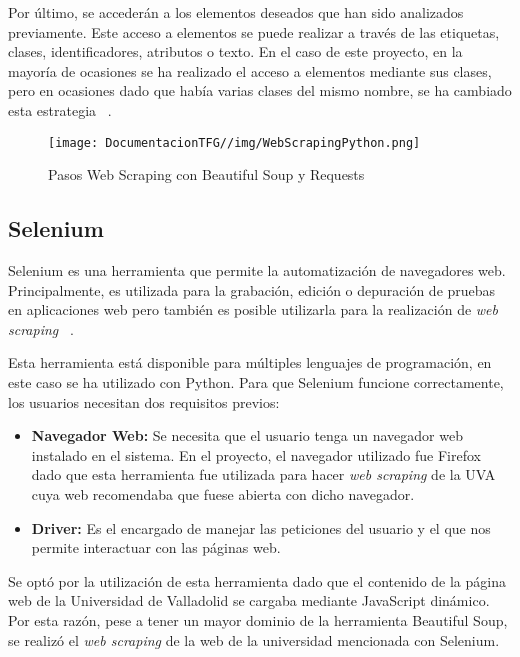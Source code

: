 Por último, se accederán a los elementos deseados que han sido analizados previamente. Este acceso a elementos se puede realizar a través de las etiquetas, clases, identificadores, atributos o texto. En el caso de este proyecto, en la mayoría de ocasiones se ha realizado el acceso a elementos mediante sus clases, pero en ocasiones dado que había varias clases del mismo nombre, se ha cambiado esta estrategia ~\cite{beautifulsoup:latex}.

\begin{figure}[H]
    \centering
    \texttt{[image: DocumentacionTFG//img/WebScrapingPython.png]}
    \caption{Pasos Web Scraping con Beautiful Soup y Requests}
    \label{fig:enter-label}
\end{figure}

\subsection{Selenium}
Selenium es una herramienta que permite la automatización de navegadores web. Principalmente, es utilizada para la grabación, edición o depuración de pruebas en aplicaciones web pero también es posible utilizarla para la realización de \textit{web scraping} ~\cite{selenium:latex}.

Esta herramienta está disponible para múltiples lenguajes de programación, en este caso se ha utilizado con Python. Para que Selenium funcione correctamente, los usuarios necesitan dos requisitos previos:

\begin{itemize}
    \item \textbf{Navegador Web:} Se necesita que el usuario tenga un navegador web instalado en el sistema. En el proyecto, el navegador utilizado fue Firefox dado que esta herramienta fue utilizada para hacer \textit{web scraping} de la UVA cuya web recomendaba que fuese abierta con dicho navegador.
    \item \textbf{Driver:} Es el encargado de manejar las peticiones del usuario y el que nos permite interactuar con las páginas web.
\end{itemize}

Se optó por la utilización de esta herramienta dado que el contenido de la página web de la Universidad de Valladolid se cargaba mediante JavaScript dinámico. Por esta razón, pese a tener un mayor dominio de la herramienta Beautiful Soup, se realizó el \textit{web scraping} de la web de la universidad mencionada con Selenium.

